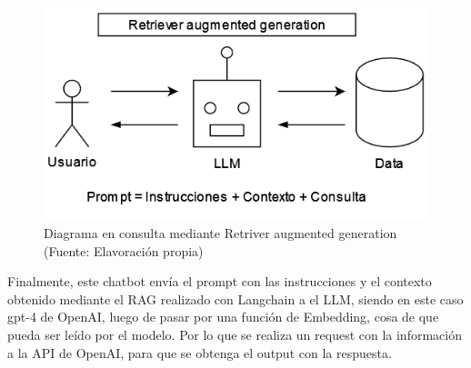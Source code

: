 \begin{figure}[ht!]
    \centering
    \includegraphics[width=.4\textwidth]{figures/huemul5.png}
    \caption[Diagrama en consulta mediante Retriver augmented generation]{Diagrama en consulta mediante Retriver augmented generation\\
    {\scriptsize (Fuente: Elavoración propia)}}
    \label{fig:chatbot1}
\end{figure}

Finalmente, este chatbot envía el prompt con las instrucciones y el contexto obtenido mediante el RAG realizado con 
Langchain a el LLM, siendo en este caso gpt-4 de OpenAI, luego de pasar por una función de Embedding, cosa de que 
pueda ser leído por el modelo. Por lo que se realiza un request con la información a la API de OpenAI, para que se 
obtenga el output con la respuesta.
